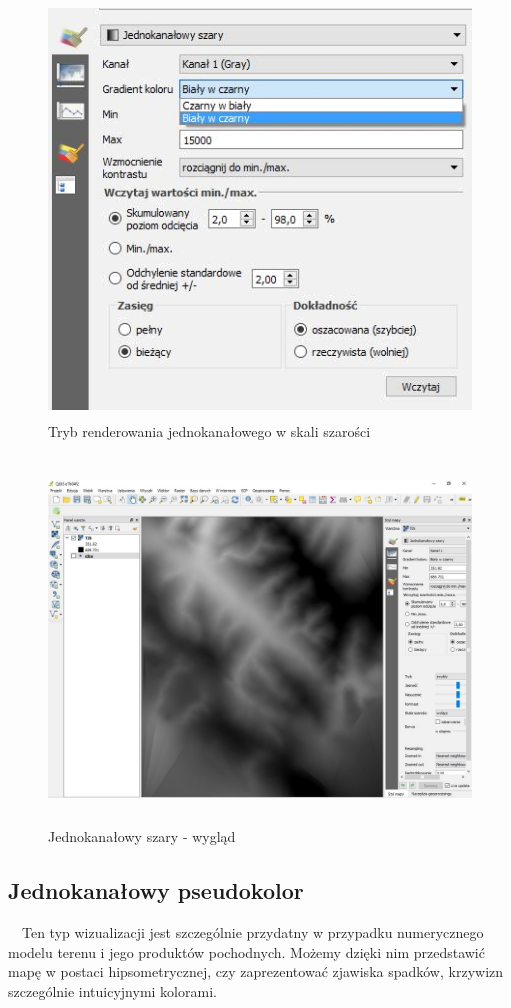 \documentclass[12pt,a4paper]{book}
\begin{document}
\begin{center}
\begin{figure}
\includegraphics[width=11.613cm,height=11.01cm]{007-raster-jedno.png}
\caption{Tryb renderowania jednokanałowego w skali szarości}
\end{figure}
\end{center}
\begin{center}
\begin{figure}
\includegraphics[width=13cm,height=9.723cm]{007-raster-szary.jpg}
\caption{Jednokanałowy szary - wygląd}
\end{figure}
\end{center}
\subsection{Jednokanałowy pseudokolor}
\ \ Ten typ wizualizacji jest szczególnie przydatny w przypadku numerycznego modelu terenu i jego produktów pochodnych. Możemy dzięki nim przedstawić mapę w postaci hipsometrycznej, czy zaprezentować zjawiska spadków, krzywizn szczególnie intuicyjnymi kolorami.
\end{document}
